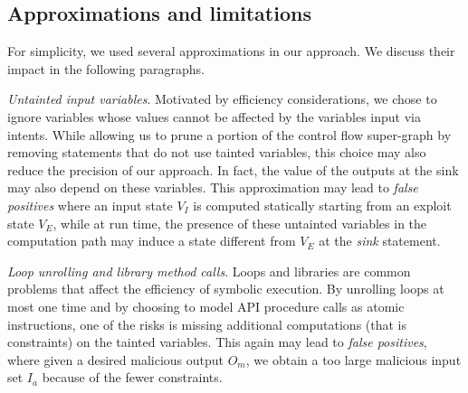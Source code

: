 

\subsection{Approximations and limitations}

For simplicity, we used several approximations in our approach. We discuss their impact in the following paragraphs.

\emph{Untainted input variables}. Motivated by efficiency considerations, we chose to ignore variables whose values cannot be affected by the variables input via intents. While allowing us to prune a portion of the control flow super-graph by removing statements that do not use tainted variables, this choice may also reduce the precision of our approach. In fact, the value of the outputs at the sink may also depend on these variables. This approximation may lead to \textit{false positives} where an input state $V_I$ is computed statically starting from an exploit state $V_E$, while at run time, the presence of these untainted variables in the computation path may induce a state different from $V_E$ at the \textit{sink} statement.

\emph{Loop unrolling and library method calls}. Loops and libraries are common problems that affect the efficiency of symbolic execution. By unrolling loops at most one time and by choosing to model API procedure calls as atomic instructions, one of the risks is missing additional computations (that is constraints) on the tainted variables. This again may lead to \textit{false positives}, where given a desired malicious output $O_m$, we obtain a too large malicious input set $I_a$ because of the fewer constraints.


